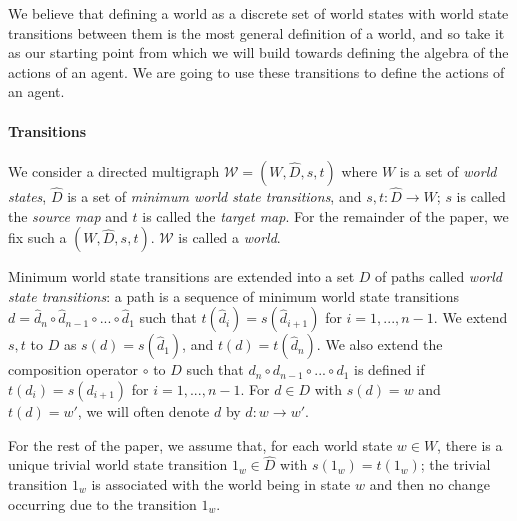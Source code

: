 We believe that defining a world as a discrete set of world states with world state transitions between them is the most general definition of a world, and so take it as our starting point from which we will build towards defining the algebra of the actions of an agent.
We are going to use these transitions to define the actions of an agent.

\paragraph{Transitions}
We consider a directed multigraph $\mathscr{W} = (W, \hat{D}, s, t)$ where $W$ is a set of \textit{world states}, $\hat{D}$ is a set of \textit{minimum world state transitions}, and $s,t: \hat{D} \to W$; $s$ is called the \textit{source map} and $t$ is called the \textit{target map}.
For the remainder of the paper, we fix such a $(W, \hat{D}, s, t)$.
$\mathscr{W}$ is called a \textit{world}.

Minimum world state transitions are extended into a set $D$ of paths called \textit{world state transitions}: a path is a sequence of minimum world state transitions $d = \hat{d}_{n} \circ \hat{d}_{n-1} \circ ... \circ \hat{d}_{1}$ such that $t(\hat{d}_{i}) = s(\hat{d}_{i+1})$ for $i = 1, ..., n-1$.
We extend $s, t$ to $D$ as $s(d) = s(\hat{d}_{1})$, and $t(d) = t(\hat{d}_{n})$.
We also extend the composition operator $\circ$ to $D$ such that $d_{n} \circ d_{n-1} \circ ... \circ d_{1}$ is defined if $t({d}_{i}) = s({d}_{i+1})$ for $i = 1, ..., n-1$.
For $d \in D$ with $s(d) = w$ and $t(d) = w'$, we will often denote $d$ by $d: w \to w'$.

For the rest of the paper, we assume that, for each world state $w \in W$, there is a unique trivial world state transition $1_{w} \in \hat{D}$ with $s(1_{w}) = t(1_{w})$; the trivial transition $1_{w}$ is associated with the world being in state $w$ and then no change occurring due to the transition $1_{w}$.

